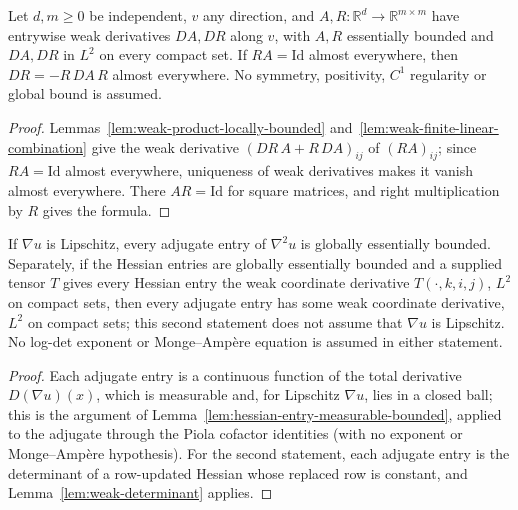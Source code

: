 \begin{lemma}
  \label{lem:weak-matrix-inverse-derivative}
  \leanok
  Let $d,m\ge0$ be independent, $v$ any direction, and $A,R:\mathbb R^d\to\mathbb R^{m\times m}$ have entrywise weak derivatives
  $DA,DR$ along $v$, with $A,R$ essentially bounded and $DA,DR$ in $L^2$ on every compact set. If $RA=\mathrm{Id}$ almost everywhere,
  then $DR=-R\,DA\,R$ almost everywhere. No symmetry, positivity, $C^1$ regularity or global bound is assumed.
\end{lemma}
\begin{proof}
  \leanok
  Lemmas~\ref{lem:weak-product-locally-bounded} and~\ref{lem:weak-finite-linear-combination} give the weak derivative
  $(DR\,A+R\,DA)_{ij}$ of $(RA)_{ij}$; since $RA=\mathrm{Id}$ almost everywhere, uniqueness of weak derivatives makes it vanish almost
  everywhere. There $AR=\mathrm{Id}$ for square matrices, and right multiplication by $R$ gives the formula.
\end{proof}

\begin{lemma}
  \label{lem:hessian-adjugate-weak-derivative}
  \leanok
  If $\nabla u$ is Lipschitz, every adjugate entry of $\nabla^2u$ is globally essentially bounded. Separately, if the Hessian entries
  are globally essentially bounded and a supplied tensor $T$ gives every Hessian entry the weak coordinate derivative $T(\cdot,k,i,j)$,
  $L^2$ on compact sets, then every adjugate entry has some weak coordinate derivative, $L^2$ on compact sets; this second statement
  does not assume that $\nabla u$ is Lipschitz. No log-det exponent or Monge--Amp\`ere equation is assumed in either statement.
\end{lemma}
\begin{proof}
  \leanok
  Each adjugate entry is a continuous function of the total derivative $D(\nabla u)(x)$, which is measurable and, for Lipschitz
  $\nabla u$, lies in a closed ball; this is the argument of Lemma~\ref{lem:hessian-entry-measurable-bounded}, applied to the adjugate
  through the Piola cofactor identities (with no exponent or Monge--Amp\`ere hypothesis). For the second statement,
  each adjugate entry is the determinant of a row-updated Hessian whose replaced row is constant, and Lemma~\ref{lem:weak-determinant}
  applies.
\end{proof}


